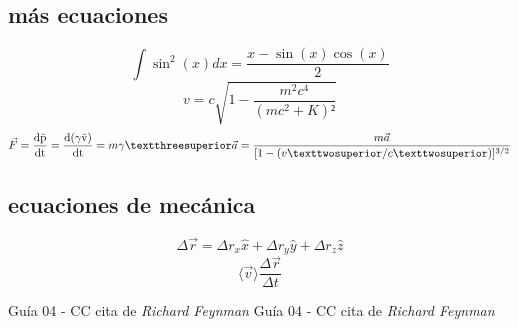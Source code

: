 \documentclass[12pt]{article}
\begin{document}
\subsection{más ecuaciones}
\begin{equation*}
	\int \sin^2(x) dx = \frac{x-\sin(x) \cos (x)}{2}	
\end{equation*}
\begin{equation*}
	v=c \sqrt{1- \frac{m^2c^4}{(mc^2+K)²}}
\end{equation*}
\begin{equation*}
	\vec{F}=\frac{\rm{d} \vec{p}}{\rm{d}t}= \frac{\rm{d}(\gamma \vec{v})}{\rm{d}t} = m\gamma³\vec{a}=\frac{m\vec{a}}{[1-(v²/c²)]^{3/2}}
\end{equation*}
\subsection{ecuaciones de mecánica}
\begin{equation}
	\Delta \vec{r} = \Delta r_x \hat{x} + \Delta r_y \hat{y}+ 	\Delta r_z \hat{z}
\end{equation}
\begin{equation}
	\langle \vec{v} \rangle \frac{\Delta \vec{r}}{\Delta t}
\end{equation}
\begin{thebibliography}{99}
 Guía 04 - CC cita de {\em Richard Feynman}
 Guía 04 - CC cita de {\em Richard Feynman}
\end{thebibliography}
\end{document}
